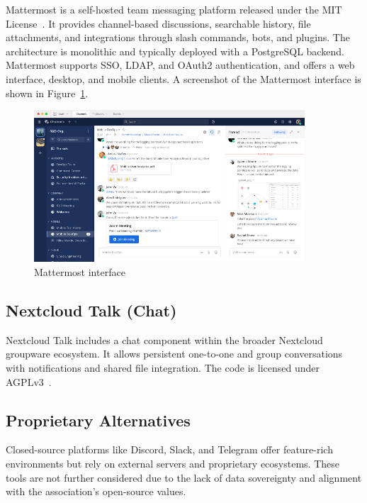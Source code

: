 Mattermost is a self-hosted team messaging platform released under the MIT License~\cite{mattermost-docs}. It provides channel-based discussions, searchable history, file attachments, and integrations through slash commands, bots, and plugins. The architecture is monolithic and typically deployed with a PostgreSQL backend. Mattermost supports SSO, LDAP, and OAuth2 authentication, and offers a web interface, desktop, and mobile clients. A screenshot of the Mattermost interface is shown in Figure~\ref{fig:mattermost-ui}.

\begin{figure}[H]
  \centering
  \includegraphics[width=0.9\textwidth]{imaxes/mattermost-ui.png}
  \caption{Mattermost interface}
  \label{fig:mattermost-ui}
\end{figure}

\subsection*{Nextcloud Talk (Chat)}

Nextcloud Talk includes a chat component within the broader Nextcloud groupware ecosystem. It allows persistent one-to-one and group conversations with notifications and shared file integration. The code is licensed under AGPLv3~\cite{nextcloud-talk-docs}.

\subsection*{Proprietary Alternatives}

Closed-source platforms like Discord, Slack, and Telegram offer feature-rich environments but rely on external servers and proprietary ecosystems. These tools are not further considered due to the lack of data sovereignty and alignment with the association's open-source values.

